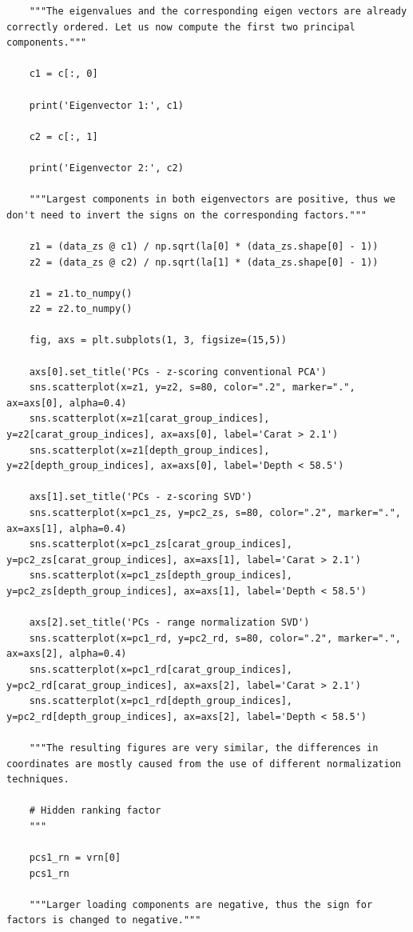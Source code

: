 \documentclass[12pt,a4paper]{article}
\begin{document}
\begin{lstlisting}
	"""The eigenvalues and the corresponding eigen vectors are already correctly ordered. Let us now compute the first two principal components."""
	
	c1 = c[:, 0]
	
	print('Eigenvector 1:', c1)
	
	c2 = c[:, 1]
	
	print('Eigenvector 2:', c2)
	
	"""Largest components in both eigenvectors are positive, thus we don't need to invert the signs on the corresponding factors."""
	
	z1 = (data_zs @ c1) / np.sqrt(la[0] * (data_zs.shape[0] - 1))
	z2 = (data_zs @ c2) / np.sqrt(la[1] * (data_zs.shape[0] - 1))
	
	z1 = z1.to_numpy()
	z2 = z2.to_numpy()
	
	fig, axs = plt.subplots(1, 3, figsize=(15,5))
	
	axs[0].set_title('PCs - z-scoring conventional PCA')
	sns.scatterplot(x=z1, y=z2, s=80, color=".2", marker=".", ax=axs[0], alpha=0.4)
	sns.scatterplot(x=z1[carat_group_indices], y=z2[carat_group_indices], ax=axs[0], label='Carat > 2.1')
	sns.scatterplot(x=z1[depth_group_indices], y=z2[depth_group_indices], ax=axs[0], label='Depth < 58.5')
	
	axs[1].set_title('PCs - z-scoring SVD')
	sns.scatterplot(x=pc1_zs, y=pc2_zs, s=80, color=".2", marker=".", ax=axs[1], alpha=0.4)
	sns.scatterplot(x=pc1_zs[carat_group_indices], y=pc2_zs[carat_group_indices], ax=axs[1], label='Carat > 2.1')
	sns.scatterplot(x=pc1_zs[depth_group_indices], y=pc2_zs[depth_group_indices], ax=axs[1], label='Depth < 58.5')
	
	axs[2].set_title('PCs - range normalization SVD')
	sns.scatterplot(x=pc1_rd, y=pc2_rd, s=80, color=".2", marker=".", ax=axs[2], alpha=0.4)
	sns.scatterplot(x=pc1_rd[carat_group_indices], y=pc2_rd[carat_group_indices], ax=axs[2], label='Carat > 2.1')
	sns.scatterplot(x=pc1_rd[depth_group_indices], y=pc2_rd[depth_group_indices], ax=axs[2], label='Depth < 58.5')
	
	"""The resulting figures are very similar, the differences in coordinates are mostly caused from the use of different normalization techniques.
	
	# Hidden ranking factor
	"""
	
	pcs1_rn = vrn[0]
	pcs1_rn
	
	"""Larger loading components are negative, thus the sign for factors is changed to negative."""
	

\end{lstlisting}
\end{document}
